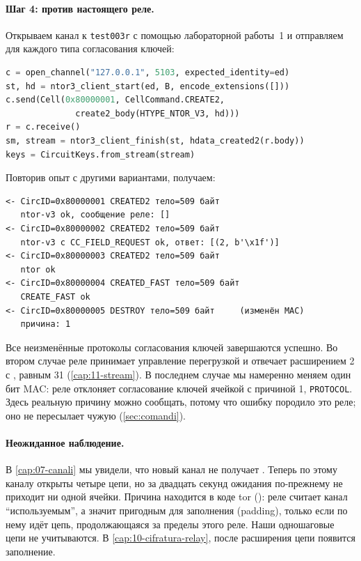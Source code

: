 \paragraph{Шаг 4: против настоящего реле.} Открываем канал к \texttt{test003r} с помощью лабораторной работы~1 и отправляем  для каждого типа согласования ключей:
\begin{lstlisting}[language=Python]
c = open_channel("127.0.0.1", 5103, expected_identity=ed)
st, hd = ntor3_client_start(ed, B, encode_extensions([]))
c.send(Cell(0x80000001, CellCommand.CREATE2,
              create2_body(HTYPE_NTOR_V3, hd)))
r = c.receive()
sm, stream = ntor3_client_finish(st, hdata_created2(r.body))
keys = CircuitKeys.from_stream(stream)
\end{lstlisting}
Повторив опыт с другими вариантами, получаем:
\begin{lstlisting}[numbers=none]
<- CircID=0x80000001 CREATED2 тело=509 байт
   ntor-v3 ok, сообщение реле: []
<- CircID=0x80000002 CREATED2 тело=509 байт
   ntor-v3 с CC_FIELD_REQUEST ok, ответ: [(2, b'\x1f')]
<- CircID=0x80000003 CREATED2 тело=509 байт
   ntor ok
<- CircID=0x80000004 CREATED_FAST тело=509 байт
   CREATE_FAST ok
<- CircID=0x80000005 DESTROY тело=509 байт     (изменён MAC)
   причина: 1
\end{lstlisting}
Все неизменённые протоколы согласования ключей завершаются успешно. Во втором случае реле принимает управление перегрузкой и отвечает расширением 2 с , равным 31 (\cref{cap:11-stream}). В последнем случае мы намеренно меняем один бит MAC: реле отклоняет согласование ключей ячейкой  с причиной 1, \texttt{PROTOCOL}. Здесь реальную причину можно сообщать, потому что ошибку породило это реле; оно не пересылает чужую  (\cref{sec:comandi}).

\paragraph{Неожиданное наблюдение.} В \cref{cap:07-canali} мы увидели, что новый канал не получает . Теперь по этому каналу открыты четыре цепи, но за двадцать секунд ожидания по-прежнему не приходит ни одной ячейки. Причина находится в коде tor (): реле считает канал \enquote{используемым}, а значит пригодным для заполнения (padding), только если по нему идёт цепь, продолжающаяся за пределы этого реле. Наши одношаговые цепи не учитываются. В \cref{cap:10-cifratura-relay}, после расширения цепи появится заполнение.

